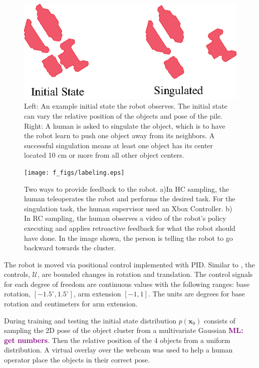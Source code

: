 \documentclass[10pt, conference]{ieeeconf}      %
\newcommand{\bx}{\mathbf{x}}
\newcommand{\mlnote}[1]{\ifthenelse{ \boolean{include-notes}}%
 {\textcolor{purple}{\textbf{ML: #1}}}{}}
\begin{document}
\begin{figure}
\centering
\includegraphics{f_figs/singulation.eps}
\caption{
    \footnotesize
Left: An example initial state the robot observes. The initial state can vary the relative position of the objects and pose of the pile. Right: A human is asked to singulate the object, which is to have the robot learn to push one object away from its neighbors. A successful singulation means at least one object has its center located 10 cm or more from all other object centers.   }

\label{fig:izzy_sing}
\end{figure}


\begin{figure}
\centering
\texttt{[image: f\_figs/labeling.eps]}
\caption{
    \footnotesize
Two ways to provide feedback to the robot. a)In HC sampling, the human teleoperates the robot and performs the desired task. For the singulation task, the human supervisor used an Xbox Controller. b) In RC sampling, the human observes a video of the robot's policy executing and applies retroactive feedback for what the robot should have done. In the image shown, the person is telling the robot to go backward towards the cluster.  }

\label{fig:labeling}
\end{figure}
The robot is moved via positional control implemented with PID. Similar to \cite{laskeyshiv}, the controls, $\mathcal{U}$,  are bounded changes in rotation and translation. The control signals for each degree of freedom are continuous values with the following ranges: base rotation, $[-1.5^\circ,1.5^\circ]$, arm extension $[-1,1]$. The units are degrees for base rotation and centimeters for arm extension. 

During training and testing the initial state distribution $p(\bx_0)$ consists of sampling the 2D pose of the object cluster from a multivariate Gaussian \mlnote{get numbers}. Then the relative position of the 4 objects from a uniform distribution.  A virtual overlay over the webcam was used to help a human operator place the objects in their correct pose. 
\end{document}
